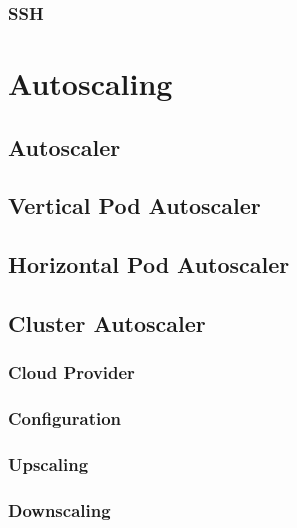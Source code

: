 \subsubsection{SSH}
\label{subsubsec:implementation_server_scale_up_ssh}

\section{Autoscaling}
\label{sec:implementation_autoscaling}

\subsection{Autoscaler}
\label{subsec:implementation_autoscaling_autoscaler}

\subsection{Vertical Pod Autoscaler}
\label{subsec:implementation_autoscaling_vertical_pod_autoscaler}

\subsection{Horizontal Pod Autoscaler}
\label{subsec:implementation_autoscaling_horizontal_pod_autoscaler}

\subsection{Cluster Autoscaler}
\label{subsec:implementation_autoscaling_cluster_autoscaler}

\subsubsection{Cloud Provider}
\label{subsubsec:implementation_autoscaling_cluster_autoscaler_cloud_provider}

\subsubsection{Configuration}
\label{subsubsec:implementation_autoscaling_cluster_autoscaler_configuration}


\subsubsection{Upscaling}
\label{subsubsec:implementation_autoscaling_cluster_autoscaler_upscaling}

\subsubsection{Downscaling}
\label{subsubsec:implementation_autoscaling_cluster_autoscaler_downscaling}